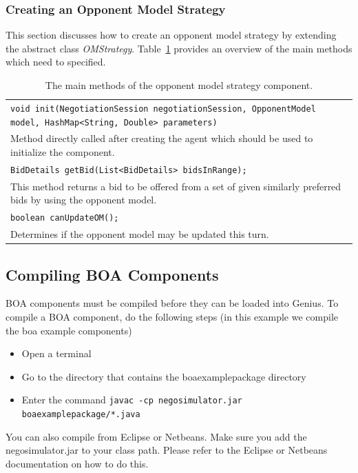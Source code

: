 \documentclass[]{article}
\begin{document}
\subsubsection{Creating an Opponent Model Strategy}
This section discusses how to create an opponent model strategy by extending the abstract class \textit{OMStrategy}. Table~\ref{tab:BOAoms} provides an overview of the main methods which need to specified.

\begin{table}[h]
\begin{tabular}{m{}}
\hline
\texttt{void init(NegotiationSession negotiationSession, OpponentModel model, HashMap<String, Double> parameters)}\\
Method directly called after creating the agent which should be used to initialize the component.\\
\hline
\texttt{BidDetails getBid(List<BidDetails> bidsInRange);}\\
This method returns a bid to be offered from a set of given similarly preferred bids by using the opponent model.\\
\hline
\texttt{boolean canUpdateOM();}\\
Determines if the opponent model may be updated this turn.\\
\hline
\end{tabular}
\caption{The main methods of the opponent model strategy component.}
\label{tab:BOAoms}
\end{table}

\subsection{Compiling BOA Components}
BOA components must be compiled before they can be loaded into Genius.
To compile a BOA component, do the following steps (in this example we compile the boa example components)
\begin{itemize}
\item Open a terminal 
\item Go to the directory that contains the boaexamplepackage directory
\item Enter the command \texttt{javac -cp negosimulator.jar boaexamplepackage/*.java }
\end{itemize}

You can also compile from Eclipse or Netbeans. Make sure you add the negosimulator.jar to your class path. Please refer to the Eclipse or Netbeans documentation on how to do this.
\end{document}
